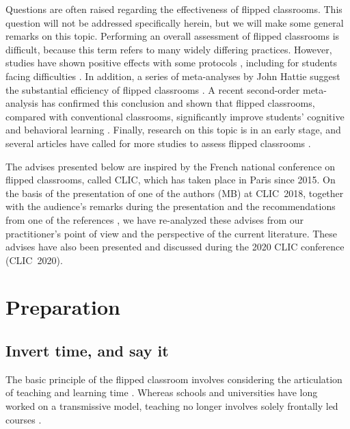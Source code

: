 \documentclass[10pt,letterpaper]{article}
\begin{document}
Questions are often raised regarding the effectiveness of flipped classrooms. This question will not be addressed specifically herein, but we will make some general remarks on this topic. Performing an overall assessment of flipped classrooms is difficult, because this term refers to many widely differing practices. However, studies have shown positive effects with some protocols
\cite{casasola_can_2017, crouch_peer_2001, freeman_reply_2014}, including for students facing difficulties \cite{lage_inverting_2000}. %
In addition, a series of meta-analyses by John Hattie \cite{hattie2014, hattie2018} suggest the substantial efficiency of flipped classrooms
\cite{chen_academic_2019,hew_flipped_2018,karagol_effect_2019,tan_effectiveness_2017}. 
A recent second-order meta-analysis has confirmed this conclusion and shown that flipped classrooms, compared with conventional classrooms,
significantly improve students’ cognitive and behavioral learning \cite{hew_does_2020}.
Finally, research on this topic is in an early stage, and several articles have called for more studies to assess flipped classrooms 
\cite{abeysekera_motivation_2015,bishop_flipped_2013,hew_does_2020,lo_critical_2017}.

The advises presented below are inspired by the French national conference on flipped classrooms, called CLIC, which has taken place 
in Paris since 2015. On the basis of the presentation of one of the authors (MB) at CLIC~2018, together with the audience’s remarks 
during the presentation and the recommendations from one of the references \cite{lo_critical_2017}, we have re-analyzed these advises from our practitioner's point of view and the perspective of the current literature.
These advises have also been presented and discussed during the 2020 CLIC conference (CLIC~2020).

\section{Preparation}

\subsection{Invert time, and say it }

The basic principle of the flipped classroom involves considering the articulation of teaching and learning time \cite{bergmann_flip_2012,schell_flipping_2015}. Whereas schools and universities have long worked on a transmissive model, 
teaching no longer involves solely frontally led courses \cite{crouch_peer_2001}.
\end{document}
